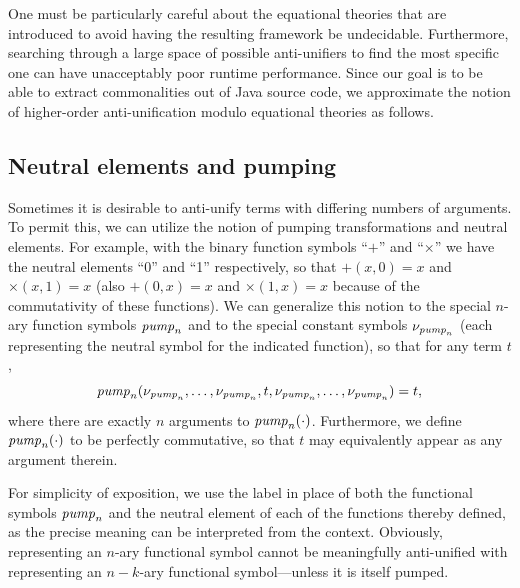 One must be particularly careful about the equational theories that are introduced to avoid having the resulting framework be undecidable.  Furthermore, searching through a large space of possible anti-unifiers to find the most specific one can have unacceptably poor runtime performance.  Since our goal is to be able to extract commonalities out of Java source code, we approximate the notion of higher-order anti-unification modulo equational theories as follows.

\subsection{Neutral elements and pumping}

Sometimes it is desirable to anti-unify terms with differing numbers of arguments.  To permit this, we can utilize the notion of pumping transformations and neutral elements.  For example, with the binary function symbols ``$+$'' and ``$\times$'' we have the neutral elements ``0'' and ``1'' respectively, so that $+(x, 0)=x$ and $\times(x, 1)=x$ (also $+(0, x)=x$ and $\times(1, x)=x$ because of the commutativity of these functions).  We can generalize this notion to the special $n$-ary function symbols $\mathit{pump}_n$ and to the special constant symbols $\nu_{\mathit{pump}_n}$ (each representing the neutral symbol for the indicated function), so that for any term $t$,
\begin{equation*}
\mathit{pump}_n(\nu_{\mathit{pump}_n}, \ldots, \nu_{\mathit{pump}_n}, t, \nu_{\mathit{pump}_n}, \ldots, \nu_{\mathit{pump}_n}) = t,
\end{equation*}
where there are exactly $n$ arguments to $\mathit{pump}_n(\cdot)$.  Furthermore, we define $\mathit{pump}_n(\cdot)$ to be perfectly commutative, so that $t$ may equivalently appear as any argument therein.

For simplicity of exposition, we use the label \NIL{} in place of both the functional symbols $\mathit{pump}_n$ and the neutral element of each of the functions thereby defined, as the precise meaning can be interpreted from the context.  Obviously, \NIL{} representing an $n$-ary functional symbol cannot be meaningfully anti-unified with \NIL{} representing an $n-k$-ary functional symbol---unless it is itself pumped.

